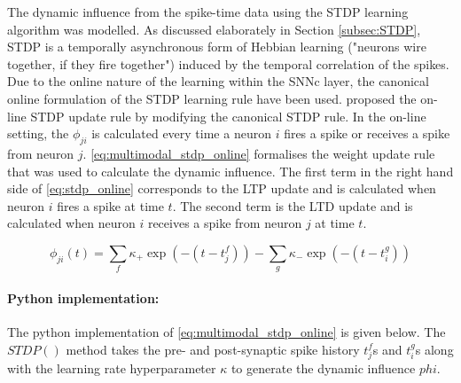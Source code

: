 The dynamic influence from the spike-time data using the STDP learning algorithm was modelled. As discussed elaborately in Section \ref{subsec:STDP}, STDP is a temporally asynchronous form of Hebbian learning ("neurons wire together, if they fire together") \citep{hebb1949organization} induced by the temporal correlation of the spikes. Due to the online nature of the learning within the SNNc layer, the canonical online formulation of the STDP learning rule have been used. \citet{sjostrom2010spike} proposed the on-line STDP update rule by modifying the canonical STDP rule. In the on-line setting, the $\phi_{ji}$ is calculated every time a neuron $i$ fires a spike or receives a spike from neuron $j$. \equationname \ref{eq:multimodal_stdp_online} formalises the weight update rule that was used to calculate the dynamic influence. The first term in the right hand side of \equationname \ref{eq:stdp_online} corresponds to the LTP update and is calculated when neuron $i$ fires a spike at time $t$. The second term is the LTD update and is calculated when neuron $i$ receives a spike from neuron $j$ at time $t$. 


\begin{equation}
\phi_{ji}(t) = \sum_f \kappa_+\exp(-(t-t_j^f))-\sum_g \kappa_- \exp(-(t-t_i^g))
\label{eq:multimodal_stdp_online}
\end{equation}

\paragraph{Python implementation:} The python implementation of \equationname \ref{eq:multimodal_stdp_online} is given below. The $STDP()$ method takes the pre- and post-synaptic spike history $t_j^f$s and $t_i^g$s along with the learning rate hyperparameter $\kappa$ to generate the dynamic influence $phi$. 

